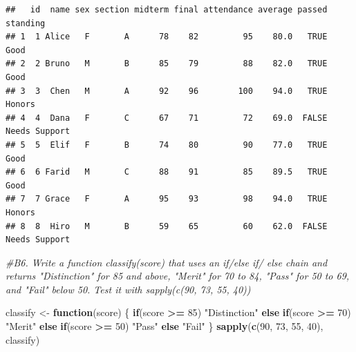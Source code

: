 \documentclass[
]{article}
\newenvironment{Shaded}{\begin{snugshade}}{\end{snugshade}}
\newcommand{\CommentTok}[1]{\textcolor[rgb]{0.56,0.35,0.01}{\textit{#1}}}
\newcommand{\ControlFlowTok}[1]{\textcolor[rgb]{0.13,0.29,0.53}{\textbf{#1}}}
\newcommand{\DecValTok}[1]{\textcolor[rgb]{0.00,0.00,0.81}{#1}}
\newcommand{\FunctionTok}[1]{\textcolor[rgb]{0.13,0.29,0.53}{\textbf{#1}}}
\newcommand{\NormalTok}[1]{#1}
\newcommand{\OtherTok}[1]{\textcolor[rgb]{0.56,0.35,0.01}{#1}}
\newcommand{\SpecialCharTok}[1]{\textcolor[rgb]{0.81,0.36,0.00}{\textbf{#1}}}
\newcommand{\StringTok}[1]{\textcolor[rgb]{0.31,0.60,0.02}{#1}}
\begin{document}
\begin{Shaded}
\end{Shaded}

\begin{verbatim}
##   id  name sex section midterm final attendance average passed      standing
## 1  1 Alice   F       A      78    82         95    80.0   TRUE          Good
## 2  2 Bruno   M       B      85    79         88    82.0   TRUE          Good
## 3  3  Chen   M       A      92    96        100    94.0   TRUE        Honors
## 4  4  Dana   F       C      67    71         72    69.0  FALSE Needs Support
## 5  5  Elif   F       B      74    80         90    77.0   TRUE          Good
## 6  6 Farid   M       C      88    91         85    89.5   TRUE          Good
## 7  7 Grace   F       A      95    93         98    94.0   TRUE        Honors
## 8  8  Hiro   M       B      59    65         60    62.0  FALSE Needs Support
\end{verbatim}

\begin{Shaded}
\begin{Highlighting}[]
\CommentTok{\#B6. Write a function classify(score) that uses an if/else if/ else chain and returns "Distinction" for 85 and above, "Merit" for 70 to 84, "Pass" for 50 to 69, and "Fail" below 50. Test it with sapply(c(90, 73, 55, 40))}

\NormalTok{classify }\OtherTok{\textless{}{-}} \ControlFlowTok{function}\NormalTok{(score) \{}
  \ControlFlowTok{if}\NormalTok{(score }\SpecialCharTok{\textgreater{}=} \DecValTok{85}\NormalTok{) }\StringTok{"Distinction"}
  \ControlFlowTok{else} \ControlFlowTok{if}\NormalTok{(score }\SpecialCharTok{\textgreater{}=} \DecValTok{70}\NormalTok{) }\StringTok{"Merit"}
  \ControlFlowTok{else} \ControlFlowTok{if}\NormalTok{(score }\SpecialCharTok{\textgreater{}=} \DecValTok{50}\NormalTok{) }\StringTok{"Pass"}
  \ControlFlowTok{else} \StringTok{"Fail"}
\NormalTok{\}}
\FunctionTok{sapply}\NormalTok{(}\FunctionTok{c}\NormalTok{(}\DecValTok{90}\NormalTok{, }\DecValTok{73}\NormalTok{, }\DecValTok{55}\NormalTok{, }\DecValTok{40}\NormalTok{), classify)}
\end{Highlighting}
\end{Shaded}
\end{document}
